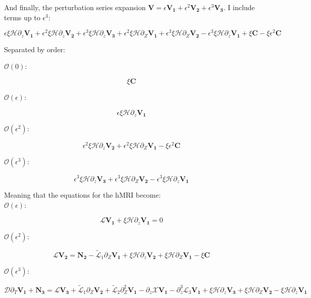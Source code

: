 \documentclass[letterpaper,12pt]{article}
\newcommand{\beq}{\begin{equation}}
\newcommand{\eeq}{\end{equation}}
\begin{document}
And finally, the perturbation series expansion $\mathbf{V} = \epsilon \mathbf{V_1} + \epsilon^2 \mathbf{V_2} + \epsilon^3 \mathbf{V_3}$. I include terms up to $\epsilon^3$:

\beq
\epsilon \xi \mathcal{H} \partial_z \mathbf{V_1} + \epsilon^2 \xi \mathcal{H} \partial_z \mathbf{V_2} + \epsilon^3 \xi \mathcal{H} \partial_z \mathbf{V_3} + \epsilon^2 \xi \mathcal{H} \partial_Z \mathbf{V_1} + \epsilon^3 \xi \mathcal{H} \partial_Z \mathbf{V_2} - \epsilon^3 \xi \mathcal{H} \partial_z \mathbf{V_1} + \xi \mathbf{C} - \xi \epsilon^2 \mathbf{C}
\eeq

Separated by order:

$\mathcal{O}(0)$:

\beq
\xi \mathbf{C}
\eeq

$\mathcal{O}(\epsilon)$:

\beq
\epsilon \xi \mathcal{H} \partial_z \mathbf{V_1}
\eeq


$\mathcal{O}(\epsilon^2)$:

\beq
\epsilon^2 \xi \mathcal{H} \partial_z \mathbf{V_2} + \epsilon^2 \xi \mathcal{H} \partial_Z \mathbf{V_1} - \xi \epsilon^2 \mathbf{C}
\eeq

$\mathcal{O}(\epsilon^3)$:

\beq
\epsilon^3 \xi \mathcal{H} \partial_z \mathbf{V_3} + \epsilon^3 \xi \mathcal{H} \partial_Z \mathbf{V_2} - \epsilon^3 \xi \mathcal{H} \partial_z \mathbf{V_1}
\eeq

Meaning that the equations for the hMRI become: \\

$\mathcal{O}(\epsilon)$:

\beq
\mathcal{L}\mathbf{V_1} + \xi \mathcal{H} \partial_z \mathbf{V_1} = 0
\eeq

$\mathcal{O}(\epsilon^2)$:

\beq
\mathcal{L} \mathbf{V_2} = \mathbf{N_2} - \widetilde{\mathcal{L}}_1 \partial_Z \mathbf{V_1} + \xi \mathcal{H} \partial_z \mathbf{V_2} + \xi \mathcal{H} \partial_Z \mathbf{V_1} - \xi \mathbf{C}
\eeq

$\mathcal{O}(\epsilon^3)$:

\beq
\mathcal{D}\partial_T \mathbf{V_1} + \mathbf{N_3} = \mathcal{L} \mathbf{V_3} + \widetilde{\mathcal{L}}_1 \partial_Z \mathbf{V_2} + \widetilde{\mathcal{L}}_2 \partial_Z^2 \mathbf{V_1} - \partial_z \mathcal{X} \mathbf{V_1} - \partial_z^3 \mathcal{L}_3 \mathbf{V_1} +  \xi \mathcal{H} \partial_z \mathbf{V_3} + \xi \mathcal{H} \partial_Z \mathbf{V_2} -  \xi \mathcal{H} \partial_z \mathbf{V_1}
\eeq
\end{document}
